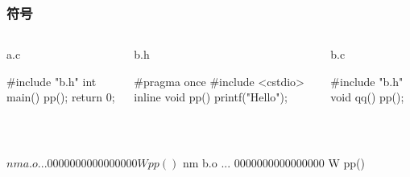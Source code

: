 \documentclass[UTF8,lualatex]{ctexbeamer}
\begin{document}
\begin{frame}[fragile,t]
    \frametitle{符号}
    \scriptsize
    \begin{columns}[t]
        \begin{column}{.3\textwidth}
            \begin{exampleblock}{a.c}
                \begin{cppcode}
                    #include "b.h"
                    int main() {
                        pp();
                        return 0;
                    }
                \end{cppcode}
            \end{exampleblock}
        \end{column}
        \begin{column}{.33\textwidth}
            \begin{exampleblock}{b.h}
                \begin{cppcode}
                    #pragma once
                    #include <cstdio>
                    inline void pp() {
                        printf("Hello\n");
                    }
                \end{cppcode}
            \end{exampleblock}
        \end{column}
        \begin{column}{.33\textwidth}
            \begin{exampleblock}{b.c}
                \begin{cppcode}
                    #include "b.h"
                    void qq() {
                        pp();
                    }
                \end{cppcode}
            \end{exampleblock}
        \end{column}
    \end{columns}
    \begin{block}{~}
        \begin{consolecode}
            $ nm a.o
            ...
            0000000000000000 W pp()
            $ nm b.o
            ...
            0000000000000000 W pp()
        \end{consolecode}
    \end{block}
\end{frame}

\end{document}
